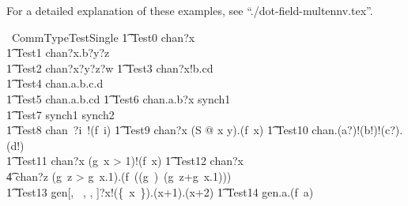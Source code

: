 For a detailed explanation of these examples, see ``./dot-field-multennv.tex''.
%
\begin{circus}
  \circprocess\ CommTypeTestSingle \circdef \circbegin
  \also %
   \t1 Test0 \circdef chan?x       \then \Skip \\
  \t1 Test1 \circdef chan?x.b?y?z \then \Skip \\
   \t1 Test2 \circdef chan?x?y?z?w \then \Skip
   \also
   \t1 Test3 \circdef chan?x!b.cd  \then \Skip \\
   \t1 Test4 \circdef chan.a.b.c.d \then \Skip\\
  \t1 Test5 \circdef chan.a.b.cd \then \Skip
   \also
    \t1 Test6 \circdef chan.a.b?x \then synch1  \then \Skip \\
   \t1 Test7 \circdef synch1 \then synch2 \then \Skip \\
   \t1 Test8 \circdef chan~?i~!(f~i) \then \Skip
       \also
   \t1 Test9 \circdef chan?x \prefixcolon (\forall S @ x \in y).(f~x) \then \Skip
    \also
  \t1 Test10 \circdef chan.(a?)!(b!)!(c?).(d!) \then \Skip \\
  \t1 Test11 \circdef chan?x \prefixcolon (g~x > 1)!(f~x) \then \Skip
    \also
   \t1 Test12 \circdef chan?x \then \\
                            \t4 chan?z \prefixcolon (g~z > g~x.1).(f~((g~\inv)~(g~z+g~x.1))) \then \Skip \\
   \t1 Test13 \circdef gen[\nat, \power~\nat, \nat, \nat]?x!(\{~x~\}).(x+1).(x+2) \then \Skip
        \also
   \t1 Test14 \circdef gen.a.(f~a) \then \Skip \\
   \circspot \Skip \\
   \circend
\end{circus}
